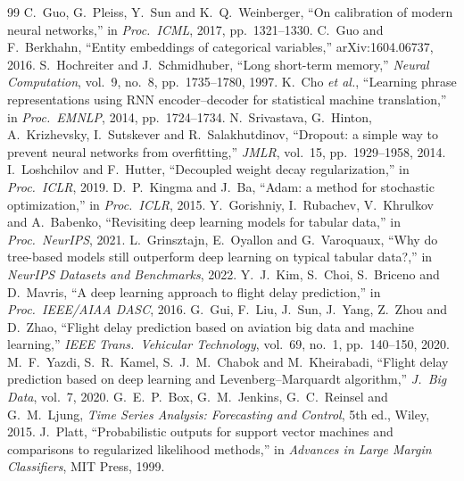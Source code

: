 \documentclass[conference]{IEEEtran}
\begin{document}
\begin{thebibliography}{99}\footnotesize
{} C.~Guo, G.~Pleiss, Y.~Sun and K.~Q.~Weinberger, ``On calibration of modern neural networks,'' in \emph{Proc.\ ICML}, 2017, pp.~1321--1330.
 C.~Guo and F.~Berkhahn, ``Entity embeddings of categorical variables,'' arXiv:1604.06737, 2016.
 S.~Hochreiter and J.~Schmidhuber, ``Long short-term memory,'' \emph{Neural Computation}, vol.~9, no.~8, pp.~1735--1780, 1997.
 K.~Cho \emph{et al.}, ``Learning phrase representations using RNN encoder--decoder for statistical machine translation,'' in \emph{Proc.\ EMNLP}, 2014, pp.~1724--1734.
 N.~Srivastava, G.~Hinton, A.~Krizhevsky, I.~Sutskever and R.~Salakhutdinov, ``Dropout: a simple way to prevent neural networks from overfitting,'' \emph{JMLR}, vol.~15, pp.~1929--1958, 2014.
 I.~Loshchilov and F.~Hutter, ``Decoupled weight decay regularization,'' in \emph{Proc.\ ICLR}, 2019.
 D.~P.~Kingma and J.~Ba, ``Adam: a method for stochastic optimization,'' in \emph{Proc.\ ICLR}, 2015.
 Y.~Gorishniy, I.~Rubachev, V.~Khrulkov and A.~Babenko, ``Revisiting deep learning models for tabular data,'' in \emph{Proc.\ NeurIPS}, 2021.
 L.~Grinsztajn, E.~Oyallon and G.~Varoquaux, ``Why do tree-based models still outperform deep learning on typical tabular data?,'' in \emph{NeurIPS Datasets and Benchmarks}, 2022.
 Y.~J.~Kim, S.~Choi, S.~Briceno and D.~Mavris, ``A deep learning approach to flight delay prediction,'' in \emph{Proc.\ IEEE/AIAA DASC}, 2016.
 G.~Gui, F.~Liu, J.~Sun, J.~Yang, Z.~Zhou and D.~Zhao, ``Flight delay prediction based on aviation big data and machine learning,'' \emph{IEEE Trans.\ Vehicular Technology}, vol.~69, no.~1, pp.~140--150, 2020.
 M.~F.~Yazdi, S.~R.~Kamel, S.~J.~M.~Chabok and M.~Kheirabadi, ``Flight delay prediction based on deep learning and Levenberg--Marquardt algorithm,'' \emph{J.\ Big Data}, vol.~7, 2020.
 G.~E.~P.~Box, G.~M.~Jenkins, G.~C.~Reinsel and G.~M.~Ljung, \emph{Time Series Analysis: Forecasting and Control}, 5th ed., Wiley, 2015.
 J.~Platt, ``Probabilistic outputs for support vector machines and comparisons to regularized likelihood methods,'' in \emph{Advances in Large Margin Classifiers}, MIT Press, 1999.
\end{thebibliography}

\onecolumn
\end{document}
